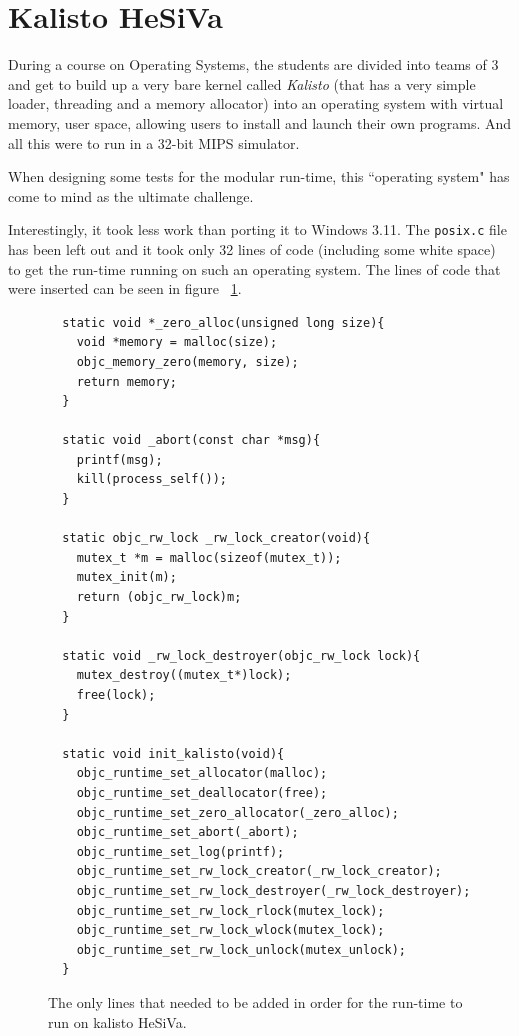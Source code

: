 \section{Kalisto HeSiVa}

During a course on Operating Systems, the students are divided into teams of 3 and get to build up a very bare kernel called \emph{Kalisto} (that has a very simple loader, threading and a memory allocator) into an operating system with virtual memory, user space, allowing users to install and launch their own programs. And all this were to run in a 32-bit MIPS simulator.

When designing some tests for the modular run-time, this ``operating system" has come to mind as the ultimate challenge.

Interestingly, it took less work than porting it to Windows 3.11. The \verb=posix.c= file has been left out and it took only 32 lines of code (including some white space) to get the run-time running on such an operating system. The lines of code that were inserted can be seen in figure ~\ref{fig:hesiva_code}.

\begin{figure}[H]
  \begin{verbatim}
  static void *_zero_alloc(unsigned long size){
    void *memory = malloc(size);
    objc_memory_zero(memory, size);
    return memory;
  }
  
  static void _abort(const char *msg){
    printf(msg);
    kill(process_self());
  }
  
  static objc_rw_lock _rw_lock_creator(void){
    mutex_t *m = malloc(sizeof(mutex_t));
    mutex_init(m);
    return (objc_rw_lock)m;
  }
  
  static void _rw_lock_destroyer(objc_rw_lock lock){
    mutex_destroy((mutex_t*)lock);
    free(lock);
  }
  
  static void init_kalisto(void){
    objc_runtime_set_allocator(malloc);
    objc_runtime_set_deallocator(free);
    objc_runtime_set_zero_allocator(_zero_alloc);
    objc_runtime_set_abort(_abort);
    objc_runtime_set_log(printf);
    objc_runtime_set_rw_lock_creator(_rw_lock_creator);
    objc_runtime_set_rw_lock_destroyer(_rw_lock_destroyer);
    objc_runtime_set_rw_lock_rlock(mutex_lock);
    objc_runtime_set_rw_lock_wlock(mutex_lock);
    objc_runtime_set_rw_lock_unlock(mutex_unlock);
  }
  \end{verbatim}
  \centering{}
  \caption{The only lines that needed to be added in order for the run-time to run on kalisto HeSiVa.}
  \label{fig:hesiva_code}
\end{figure}


